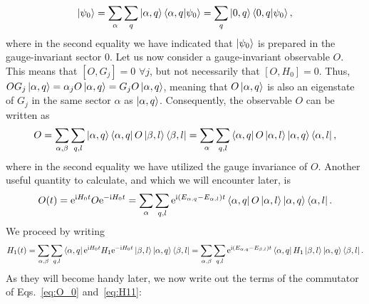 \documentclass[aps,prl,reprint,twocolumn,superscriptaddress,floatfix,nofootinbib]{revtex4-1}
\begin{document}
\begin{align}
\ket{\psi_0}=\sum_{\alpha}\sum_q\ket{\alpha,q}\bra{\alpha,q}\ket{\psi_0}=\sum_q\ket{0,q}\bra{0,q}\ket{\psi_0},
\end{align}
where in the second equality we have indicated that $\ket{\psi_0}$ is prepared in the gauge-invariant sector $0$. Let us now consider a gauge-invariant observable $O$. This means that $[O,G_j]=0$ $\forall j$, but not necessarily that $[O,H_0]=0$. Thus, $OG_j\ket{\alpha,q}=\alpha_j O\ket{\alpha,q}=G_jO\ket{\alpha,q}$, meaning that $O\ket{\alpha,q}$ is also an eigenstate of $G_j$ in the same sector $\alpha$ as $\ket{\alpha,q}$. Consequently, the observable $O$ can be written as 
\begin{align}\label{eq:O}
O=\sum_{\alpha,\beta}\sum_{q,l}\ket{\alpha,q}\bra{\alpha,q}O\ket{\beta,l}\bra{\beta,l}=\sum_{\alpha}\sum_{q,l}\bra{\alpha,q}O\ket{\alpha,l}\ket{\alpha,q}\bra{\alpha,l},
\end{align}
where in the second equality we have utilized the gauge invariance of $O$. Another useful quantity to calculate, and which we will encounter later, is 
\begin{align}\label{eq:O_0}
O(t)=\mathrm{e}^{\mathrm{i}H_0t}O\mathrm{e}^{-\mathrm{i}H_0t}=\sum_{\alpha}\sum_{q,l}\mathrm{e}^{\mathrm{i}(E_{\alpha,q}-E_{\alpha,l})t}\bra{\alpha,q}O\ket{\alpha,l}\ket{\alpha,q}\bra{\alpha,l}.
\end{align}
We proceed by writing
\begin{align}\label{eq:H11}
H_1(t)=\sum_{\alpha,\beta}\sum_{q,l}\bra{\alpha,q}\mathrm{e}^{\mathrm{i}H_0t}H_1\mathrm{e}^{-\mathrm{i}H_0t}\ket{\beta,l}\ket{\alpha,q}\bra{\beta,l}=\sum_{\alpha,\beta}\sum_{q,l}\mathrm{e}^{\mathrm{i}(E_{\alpha,q}-E_{\beta,l})t}\bra{\alpha,q}H_1\ket{\beta,l}\ket{\alpha,q}\bra{\beta,l}.
\end{align}
As they will become handy later, we now write out the terms of the commutator of Eqs.~\eqref{eq:O_0} and~\eqref{eq:H11}:
\end{document}
